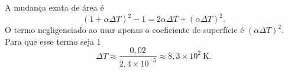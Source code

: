 A mudança exata de área é
\[
(1+\alpha\Delta T)^{2}-1 = 2\alpha\Delta T + (\alpha\Delta T)^{2}.
\]
O termo negligenciado ao usar apenas o coeficiente de superfície é $(\alpha\Delta T)^{2}$. Para que esse termo seja 1%
\[
\Delta T \approx \frac{0{,}02}{2{,}4\times10^{-5}} \approx 8,3\times10^{2}\ \mathrm{K}.
\]